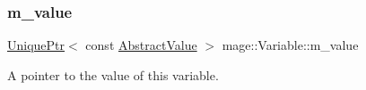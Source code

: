 \subsubsection{\texorpdfstring{m\+\_\+value}{m\_value}}
{\footnotesize\ttfamily \hyperlink{namespacemage_a3316d7143a973e37adf1110f2e80ca31}{Unique\+Ptr}$<$ const \hyperlink{structmage_1_1_variable_1_1_abstract_value}{Abstract\+Value} $>$ mage\+::\+Variable\+::m\+\_\+value\hspace{0.3cm}{\ttfamily [private]}}

A pointer to the value of this variable. 